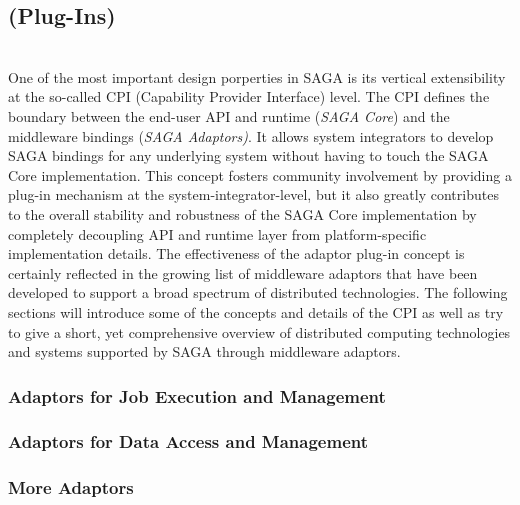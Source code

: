   \subsection{\thesagaimpladap (Plug-Ins)}
  \\
   One of the most important design porperties in SAGA is its vertical
   extensibility at the so-called CPI (Capability Provider Interface) level.
   The CPI defines the boundary between the end-user  API and runtime (\textit{SAGA Core}) and the middleware
   bindings (\textit{SAGA Adaptors)}.  It allows system integrators to develop
   SAGA bindings for any underlying system without having to touch the SAGA
   Core implementation.  This concept fosters community involvement by
   providing a plug-in mechanism at the  system-integrator-level, but it also greatly contributes to the
   overall stability and robustness of the SAGA Core implementation by
   completely decoupling API and runtime layer from platform-specific
   implementation details. The effectiveness of the adaptor plug-in concept is
   certainly reflected in the growing list of middleware adaptors that have
   been developed to support a broad spectrum of distributed technologies. The
   following sections will introduce some of the concepts and details of the
   CPI as well as try to give a short, yet comprehensive overview of
   distributed computing technologies and systems supported by SAGA through
   middleware adaptors.

 
  \subsubsection{Adaptors for Job Execution and Management} 


  \subsubsection{Adaptors for Data Access and Management} 

   \subsubsection{More Adaptors}


